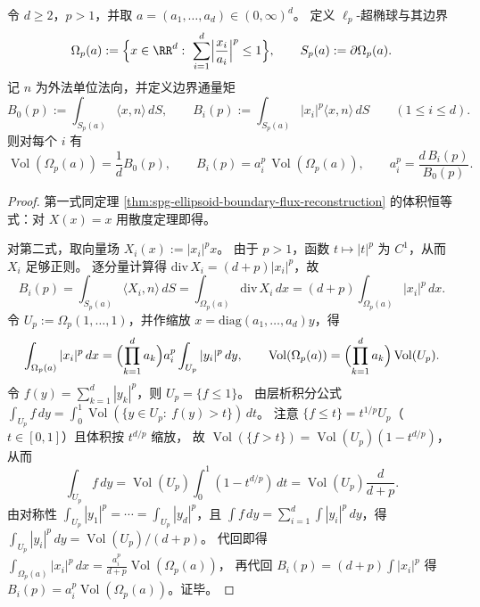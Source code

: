 \begin{theorem}\label{thm:spg-lp-superellipsoid-boundary-volume-decoding}
令 \(d\ge 2\)，\(p>1\)，并取 \(a=(a_1,\dots,a_d)\in(0,\infty)^d\)。
定义 \(\ell_p\)-超椭球与其边界
\[
\Omega_p(a):=\Bigl\{x\in\RR^d:\ \sum_{i=1}^d\Bigl|\frac{x_i}{a_i}\Bigr|^p\le 1\Bigr\},
\qquad
S_p(a):=\partial\Omega_p(a).
\]
记 \(n\) 为外法单位法向，并定义边界通量矩
\[
B_0(p):=\int_{S_p(a)}\langle x,n\rangle\,dS,
\qquad
B_i(p):=\int_{S_p(a)}|x_i|^p\langle x,n\rangle\,dS\qquad(1\le i\le d).
\]
则对每个 \(i\) 有
\[
\operatorname{Vol}(\Omega_p(a))=\frac{1}{d}B_0(p),
\qquad
B_i(p)=a_i^p\,\operatorname{Vol}(\Omega_p(a)),
\qquad
a_i^p=\frac{d\,B_i(p)}{B_0(p)}.
\]
\end{theorem}
\begin{proof}
第一式同定理 \ref{thm:spg-ellipsoid-boundary-flux-reconstruction} 的体积恒等式：对 \(X(x)=x\) 用散度定理即得。
\par
对第二式，取向量场 \(X_i(x):=|x_i|^p x\)。
由于 \(p>1\)，函数 \(t\mapsto |t|^p\) 为 \(C^1\)，从而 \(X_i\) 足够正则。
逐分量计算得 \(\mathrm{div}\,X_i=(d+p)|x_i|^p\)，故
\[
B_i(p)=\int_{S_p(a)}\langle X_i,n\rangle\,dS
=\int_{\Omega_p(a)}\mathrm{div}\,X_i\,dx
=(d+p)\int_{\Omega_p(a)}|x_i|^p\,dx.
\]
令 \(U_p:=\Omega_p(1,\dots,1)\)，并作缩放 \(x=\mathrm{diag}(a_1,\dots,a_d)y\)，得
\[
\int_{\Omega_p(a)}|x_i|^p\,dx
=\Bigl(\prod_{k=1}^d a_k\Bigr)a_i^p\int_{U_p}|y_i|^p\,dy,
\qquad
\operatorname{Vol}(\Omega_p(a))
=\Bigl(\prod_{k=1}^d a_k\Bigr)\operatorname{Vol}(U_p).
\]
令 \(f(y)=\sum_{k=1}^d|y_k|^p\)，则 \(U_p=\{f\le 1\}\)。
由层析积分公式 \(\int_{U_p} f\,dy=\int_0^1 \operatorname{Vol}(\{y\in U_p:\ f(y)>t\})\,dt\)。
注意 \(\{f\le t\}=t^{1/p}U_p\)（\(t\in[0,1]\)）且体积按 \(t^{d/p}\) 缩放，
故 \(\operatorname{Vol}(\{f>t\})=\operatorname{Vol}(U_p)(1-t^{d/p})\)，从而
\[
\int_{U_p} f\,dy
=\operatorname{Vol}(U_p)\int_0^1(1-t^{d/p})\,dt
=\operatorname{Vol}(U_p)\frac{d}{d+p}.
\]
由对称性 \(\int_{U_p}|y_1|^p=\cdots=\int_{U_p}|y_d|^p\)，且 \(\int f\,dy=\sum_{i=1}^d\int|y_i|^p\,dy\)，得
\(
\int_{U_p}|y_i|^p\,dy=\operatorname{Vol}(U_p)/(d+p)
\)。
代回即得
\(
\int_{\Omega_p(a)}|x_i|^p\,dx=\frac{a_i^p}{d+p}\operatorname{Vol}(\Omega_p(a))
\)，
再代回 \(B_i(p)=(d+p)\int |x_i|^p\) 得 \(B_i(p)=a_i^p\operatorname{Vol}(\Omega_p(a))\)。证毕。
\end{proof}

